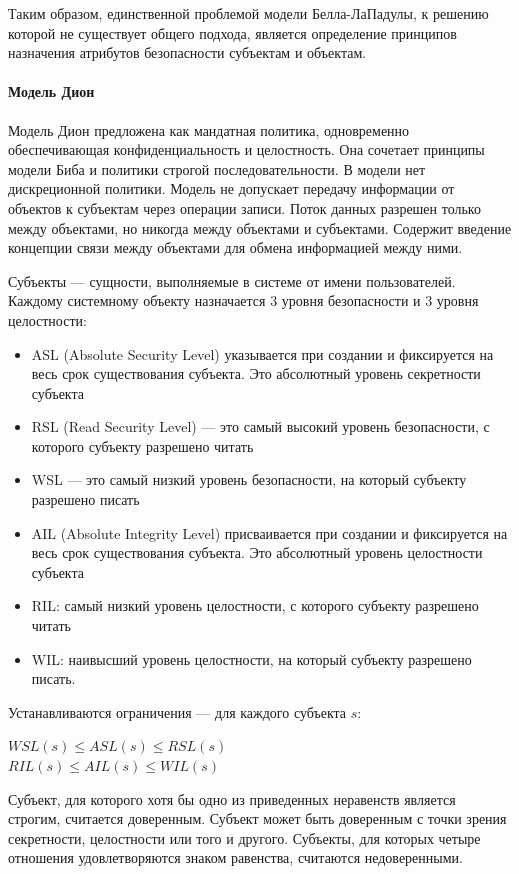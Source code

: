 Таким образом, единственной проблемой модели Белла-ЛаПадулы, к решению которой не существует общего подхода, является определение принципов назначения атрибутов безопасности субъектам и объектам.

\paragraph{Модель Дион}

Модель Дион предложена как мандатная политика, одновременно обеспечивающая конфиденциальность и целостность.
Она сочетает принципы модели Биба и политики строгой последовательности. В модели нет дискреционной
политики. Модель не допускает передачу информации от объектов к субъектам через операции записи. Поток данных
разрешен только между объектами, но никогда между объектами и субъектами. Содержит введение концепции связи между
объектами для обмена информацией между ними.

Субъекты --- сущности, выполняемые в системе от имени пользователей. Каждому системному объекту назначается
3 уровня безопасности и 3 уровня целостности:
\begin{itemize}
    \item ASL (Absolute Security Level) указывается при создании и фиксируется на весь срок существования субъекта. Это абсолютный уровень секретности субъекта
    \item RSL (Read Security Level) --- это самый высокий уровень безопасности, с которого субъекту разрешено читать
    \item WSL --- это самый низкий уровень безопасности, на который субъекту разрешено писать
    \item AIL (Absolute Integrity Level) присваивается при создании и фиксируется на весь срок существования субъекта. Это абсолютный уровень целостности субъекта
    \item RIL: самый низкий уровень целостности, с которого субъекту разрешено читать
    \item WIL: наивысший уровень целостности, на который субъекту разрешено писать.
\end{itemize}

Устанавливаются ограничения --- для каждого субъекта $s$:

\begin{center}
$WSL(s) \leqslant ASL(s) \leq RSL(s)$ \\
$RIL(s) \leqslant AIL(s) \leq WIL(s)$
\end{center}

Субъект, для которого хотя бы одно из приведенных неравенств является строгим, считается доверенным. Субъект может
быть доверенным с точки зрения секретности, целостности или того и другого. Субъекты, для которых четыре отношения
удовлетворяются знаком равенства, считаются недоверенными.

